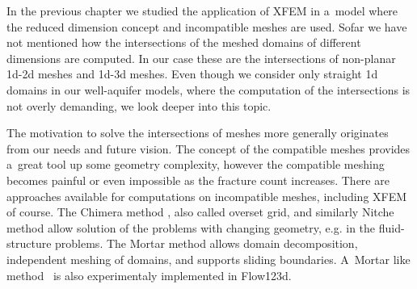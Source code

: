 

In the previous chapter we studied the application of XFEM in a~model where the reduced dimension concept
and incompatible meshes are used. Sofar we have not mentioned how the intersections of the meshed domains of different dimensions
are computed. In our case these are the intersections of non-planar 1d-2d meshes and 1d-3d meshes. 
Even though we consider only straight 1d domains in our well-aquifer models, where the computation of the intersections is not overly demanding,
we look deeper into this topic.

The motivation to solve the intersections of meshes more generally originates from our needs and future vision.
The concept of the compatible meshes provides a~great tool up some geometry complexity,
however the compatible meshing becomes painful or even impossible as the fracture count increases.
There are approaches available for computations on incompatible meshes, including XFEM of course.
The Chimera method \cite{brezzi_analysis_2001}, also called overset grid, and similarly Nitche method \cite{massing_efficient_2013}
allow solution of the problems with changing geometry, e.g. in the fluid-structure problems. 
The Mortar method \cite{belgacem_mortar_1999} allows domain decomposition, independent meshing of domains, and supports sliding boundaries.
A~Mortar like method~\cite{brezina_2012} is also experimentaly implemented in Flow123d.

